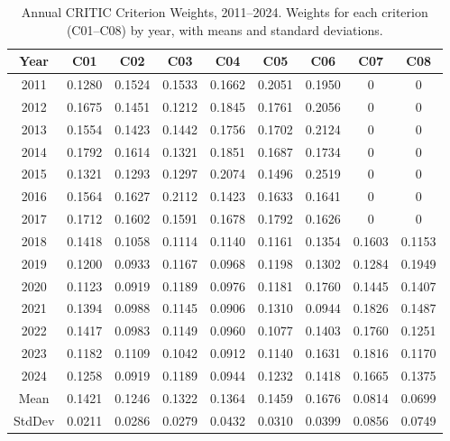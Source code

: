 \begin{table}[H]
\centering
\caption{Annual CRITIC Criterion Weights, 2011--2024. Weights for each criterion (C01--C08) by year, with means and standard deviations.}
\label{tab:annual-critic-weights}
\small
\begin{tabular}{ccccccccc}
\toprule
\textbf{Year} & \textbf{C01} & \textbf{C02} & \textbf{C03} & \textbf{C04} & \textbf{C05} & \textbf{C06} & \textbf{C07} & \textbf{C08} \\
\midrule
2011 & 0.1280 & 0.1524 & 0.1533 & 0.1662 & 0.2051 & 0.1950 & 0     & 0     \\
2012 & 0.1675 & 0.1451 & 0.1212 & 0.1845 & 0.1761 & 0.2056 & 0     & 0     \\
2013 & 0.1554 & 0.1423 & 0.1442 & 0.1756 & 0.1702 & 0.2124 & 0     & 0     \\
2014 & 0.1792 & 0.1614 & 0.1321 & 0.1851 & 0.1687 & 0.1734 & 0     & 0     \\
2015 & 0.1321 & 0.1293 & 0.1297 & 0.2074 & 0.1496 & 0.2519 & 0     & 0     \\
2016 & 0.1564 & 0.1627 & 0.2112 & 0.1423 & 0.1633 & 0.1641 & 0     & 0     \\
2017 & 0.1712 & 0.1602 & 0.1591 & 0.1678 & 0.1792 & 0.1626 & 0     & 0     \\
2018 & 0.1418 & 0.1058 & 0.1114 & 0.1140 & 0.1161 & 0.1354 & 0.1603 & 0.1153 \\
2019 & 0.1200 & 0.0933 & 0.1167 & 0.0968 & 0.1198 & 0.1302 & 0.1284 & 0.1949 \\
2020 & 0.1123 & 0.0919 & 0.1189 & 0.0976 & 0.1181 & 0.1760 & 0.1445 & 0.1407 \\
2021 & 0.1394 & 0.0988 & 0.1145 & 0.0906 & 0.1310 & 0.0944 & 0.1826 & 0.1487 \\
2022 & 0.1417 & 0.0983 & 0.1149 & 0.0960 & 0.1077 & 0.1403 & 0.1760 & 0.1251 \\
2023 & 0.1182 & 0.1109 & 0.1042 & 0.0912 & 0.1140 & 0.1631 & 0.1816 & 0.1170 \\
2024 & 0.1258 & 0.0919 & 0.1189 & 0.0944 & 0.1232 & 0.1418 & 0.1665 & 0.1375 \\
\midrule
Mean   & 0.1421 & 0.1246 & 0.1322 & 0.1364 & 0.1459 & 0.1676 & 0.0814 & 0.0699 \\
StdDev & 0.0211 & 0.0286 & 0.0279 & 0.0432 & 0.0310 & 0.0399 & 0.0856 & 0.0749 \\
\bottomrule
\end{tabular}
\end{table}
